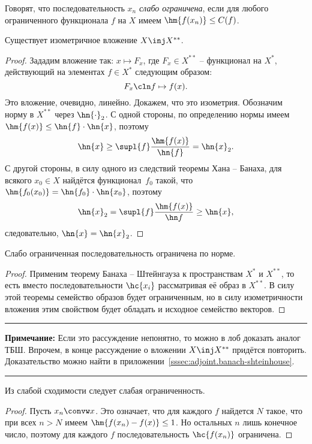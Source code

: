 \documentclass[a4paper]{article}
\newcommand{\comment}[1]{\par\vskip2pt\hrule\vskip2pt{\footnotesize \textbf{Примечание:} #1\par}\vskip2pt\hrule\vskip2pt}
\begin{document}
\begin{df}
Говорят, что последовательность $x_n$ \emph{слабо ограничена}, если для любого ограниченного функционала $f$
на $X$ имеем $\hm{f(x_n)} \le C(f)$.
\end{df}


\begin{lemma}
Существует изометричное вложение $X \inj X^{**}$.
\end{lemma}
\begin{proof}
Зададим вложение так: $x \mapsto F_x$, где $F_x \in X^{**}$ -- функционал на $X^*$,
действующий на элементах $f \in X^*$ следующим образом:
$$F_x\cln f \mapsto f(x).$$
Это вложение, очевидно, линейно. Докажем, что это изометрия. Обозначим норму в $X^{**}$ через $\hn{\cdot}_2$.
С одной стороны, по определению нормы имеем $\hm{f(x)} \le \hn{f} \cdot \hn{x}$, поэтому
$$\hn{x} \ge \supl{f} \frac{\hm{f(x)}}{\hn{f}} = \hn{x}_2.$$
С другой стороны, в силу одного из следствий теоремы Хана -- Банаха,
для всякого $x_0 \in X$ найдётся функционал~$f_0$ такой, что
$\hm{f_0(x_0)} = \hn{f_0} \cdot \hn{x_0}$, поэтому
$$\hn{x}_2 = \supl{f}\frac{\hm{f(x)}}{\hn f} \ge \hn{x},$$
следовательно, $\hn{x} = \hn{x}_2$.
\end{proof}

\begin{stm}
Слабо ограниченная последовательность ограничена по норме.
\end{stm}
\begin{proof}
Применим теорему Банаха -- Штейнгауза к пространствам $X^*$ и $X^{**}$,
то есть вместо последовательности $\hc{x_i}$ рассматривая её образ в $X^{**}$.
В силу этой теоремы семейство образов будет ограниченным, но в силу изометричности вложения
этим свойством будет обладать и исходное семейство векторов.
\end{proof}

\comment{Если это рассуждение непонятно, то можно в лоб доказать аналог ТБШ. Впрочем, в конце
рассуждение о вложении $X \inj X^{**}$ придётся повторить. Доказательство можно найти
в приложении~\ref{sssec:adjoint.banach-shteinhouse}.}

\begin{stm}
Из слабой сходимости следует слабая ограниченность.
\end{stm}
\begin{proof}
Пусть $x_n \convw x$. Это означает, что для каждого $f$ найдется $N$ такое, что при
всех $n>N$ имеем $\hm{f(x_n) - f(x)} \le 1$. Но остальных $n$ лишь конечное число,
поэтому для каждого $f$ последовательность $\hc{f(x_n)}$ ограничена.
\end{proof}
\end{document}
